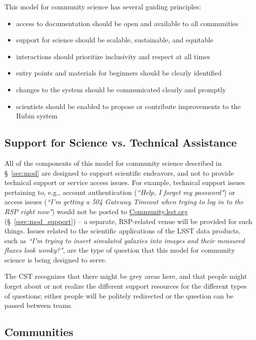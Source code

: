 \documentclass[DM,authoryear,toc]{lsstdoc}
\begin{document}
This model for community science has several guiding principles:
\begin{itemize}
\item access to documentation should be open and available to all communities
\item support for science should be scalable, sustainable, and equitable
\item interactions should prioritize inclusivity and respect at all times
\item entry points and materials for beginners should be clearly identified
\item changes to the system should be communicated clearly and promptly
\item scientists should be enabled to propose or contribute improvements to the Rubin system
\end{itemize}


\subsection{Support for Science vs. Technical Assistance}\label{ssec:intro_tech}

All of the components of this model for community science described in \S~\ref{sec:mod} are designed to support scientific endeavors, and not to provide technical support or service access issues.
For example, technical support issues pertaining to, e.g., account authentication (\textit{``Help, I forget my password"}) or access issues (\textit{``I'm getting a 504 Gateway Timeout when trying to log in to the RSP right now"}) would not be posted to \url{Community.lsst.org} (\S~\ref{ssec:mod_support}) -- a separate, RSP-related venue will be provided for such things.
Issues related to the scientific applications of the LSST data products, such as \textit{``I'm trying to insert simulated galaxies into images and their measured fluxes look wonky?"}, are the type of question that this model for community science is being designed to serve.

The CST recognizes that there might be grey areas here, and that people might forget about or not realize the different support resources for the different types of questions; either people will be politely redirected or the question can be passed between teams.


\subsection{Communities}\label{ssec:intro_comms}
\end{document}

